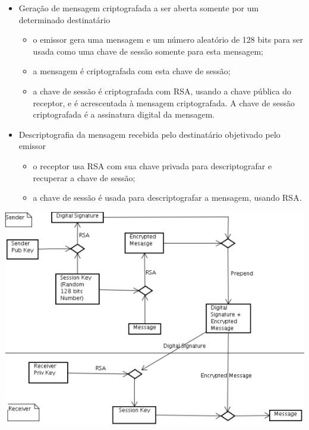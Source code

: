\begin{itemize}
  \item Geração de mensagem criptografada a ser aberta somente por um determinado destinatário
	\begin{itemize}
		\item o emissor gera uma mensagem e um número aleatório de 128 bits para ser usada como uma chave de sessão somente para esta mensagem;
		\item a mensagem é criptografada com esta chave de sessão;
		\item a chave de sessão é criptografada com RSA, usando a chave pública do receptor, e é acrescentada à mensagem criptografada.
    {\color{red}A chave de sessão criptografada é a assinatura digital da mensagem.} 
	\end{itemize}

  \item Descriptografia da mensagem recebida pelo destinatário objetivado pelo emissor
	\begin{itemize}
		\item o receptor usa RSA com sua chave privada para descriptografar e recuperar a chave de sessão;
		\item a chave de sessão é usada para descriptografar a mensagem, {\color{red}usando RSA}.
	\end{itemize}
\end{itemize}

\begin{center}
	\includegraphics[scale=0.7]{images/pgp-confidentiality.png}
	\label{fig:pgp-confidentiality}
\end{center}


